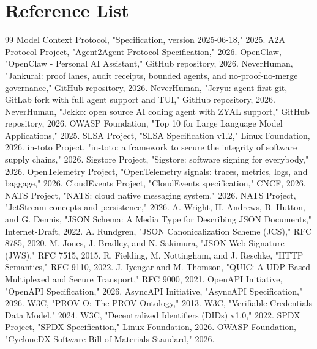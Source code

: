\documentclass[journal,onecolumn]{IEEEtran}
\begin{document}
\section{Reference List}
\balance
\begin{thebibliography}{99}
 Model Context Protocol, "Specification, version 2025-06-18," 2025.
 A2A Protocol Project, "Agent2Agent Protocol Specification," 2026.
 OpenClaw, "OpenClaw - Personal AI Assistant," GitHub repository, 2026.
 NeverHuman, "Jankurai: proof lanes, audit receipts, bounded agents, and no-proof-no-merge governance," GitHub repository, 2026.
 NeverHuman, "Jeryu: agent-first git, GitLab fork with full agent support and TUI," GitHub repository, 2026.
 NeverHuman, "Jekko: open source AI coding agent with ZYAL support," GitHub repository, 2026.
 OWASP Foundation, "Top 10 for Large Language Model Applications," 2025.
 SLSA Project, "SLSA Specification v1.2," Linux Foundation, 2026.
 in-toto Project, "in-toto: a framework to secure the integrity of software supply chains," 2026.
 Sigstore Project, "Sigstore: software signing for everybody," 2026.
 OpenTelemetry Project, "OpenTelemetry signals: traces, metrics, logs, and baggage," 2026.
 CloudEvents Project, "CloudEvents specification," CNCF, 2026.
 NATS Project, "NATS: cloud native messaging system," 2026.
 NATS Project, "JetStream concepts and persistence," 2026.
 A. Wright, H. Andrews, B. Hutton, and G. Dennis, "JSON Schema: A Media Type for Describing JSON Documents," Internet-Draft, 2022.
 A. Rundgren, "JSON Canonicalization Scheme (JCS)," RFC 8785, 2020.
 M. Jones, J. Bradley, and N. Sakimura, "JSON Web Signature (JWS)," RFC 7515, 2015.
 R. Fielding, M. Nottingham, and J. Reschke, "HTTP Semantics," RFC 9110, 2022.
 J. Iyengar and M. Thomson, "QUIC: A UDP-Based Multiplexed and Secure Transport," RFC 9000, 2021.
 OpenAPI Initiative, "OpenAPI Specification," 2026.
 AsyncAPI Initiative, "AsyncAPI Specification," 2026.
 W3C, "PROV-O: The PROV Ontology," 2013.
 W3C, "Verifiable Credentials Data Model," 2024.
 W3C, "Decentralized Identifiers (DIDs) v1.0," 2022.
 SPDX Project, "SPDX Specification," Linux Foundation, 2026.
 OWASP Foundation, "CycloneDX Software Bill of Materials Standard," 2026.

\end{thebibliography}
\end{document}
